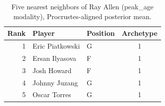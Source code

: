 \begin{table}[htbp]
  \centering\small
  \begin{tabular}{rllc}
    \toprule
    Rank & Player & Position & Archetype \\
    \midrule
    1 & Eric Piatkowski & G & 1 \\
    2 & Ersan Ilyasova & F & 1 \\
    3 & Josh Howard & F & 1 \\
    4 & Johnny Juzang & G & 1 \\
    5 & Oscar Torres & G & 1 \\
    \bottomrule
  \end{tabular}
  \caption{Five nearest neighbors of Ray Allen (peak_age modality), Procrustes-aligned posterior mean.}
  \label{tab:Ray_Allen_neighbors_peak_age}
\end{table}

